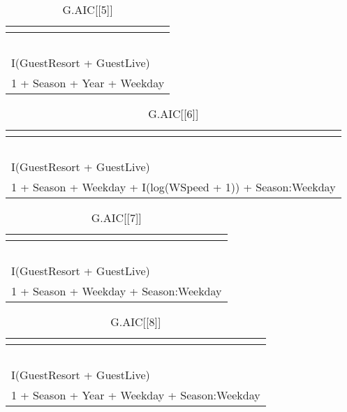 %
\begin{table}[!tbp]
\caption{G.AIC[[5]]\label{G.AIC[[5]]}} 
\begin{center}
\begin{tabular}{l}
\hline\hline
\multicolumn{1}{c}{}\tabularnewline
\hline
~\tabularnewline
I(GuestResort + GuestLive)\tabularnewline
1 + Season + Year + Weekday\tabularnewline
\hline
\end{tabular}
\end{center}
\end{table}

%
\begin{table}[!tbp]
\caption{G.AIC[[6]]\label{G.AIC[[6]]}} 
\begin{center}
\begin{tabular}{l}
\hline\hline
\multicolumn{1}{c}{}\tabularnewline
\hline
~\tabularnewline
I(GuestResort + GuestLive)\tabularnewline
1 + Season + Weekday + I(log(WSpeed + 1)) + Season:Weekday\tabularnewline
\hline
\end{tabular}
\end{center}
\end{table}

%
\begin{table}[!tbp]
\caption{G.AIC[[7]]\label{G.AIC[[7]]}} 
\begin{center}
\begin{tabular}{l}
\hline\hline
\multicolumn{1}{c}{}\tabularnewline
\hline
~\tabularnewline
I(GuestResort + GuestLive)\tabularnewline
1 + Season + Weekday + Season:Weekday\tabularnewline
\hline
\end{tabular}
\end{center}
\end{table}

%
\begin{table}[!tbp]
\caption{G.AIC[[8]]\label{G.AIC[[8]]}} 
\begin{center}
\begin{tabular}{l}
\hline\hline
\multicolumn{1}{c}{}\tabularnewline
\hline
~\tabularnewline
I(GuestResort + GuestLive)\tabularnewline
1 + Season + Year + Weekday + Season:Weekday\tabularnewline
\hline
\end{tabular}
\end{center}
\end{table}

